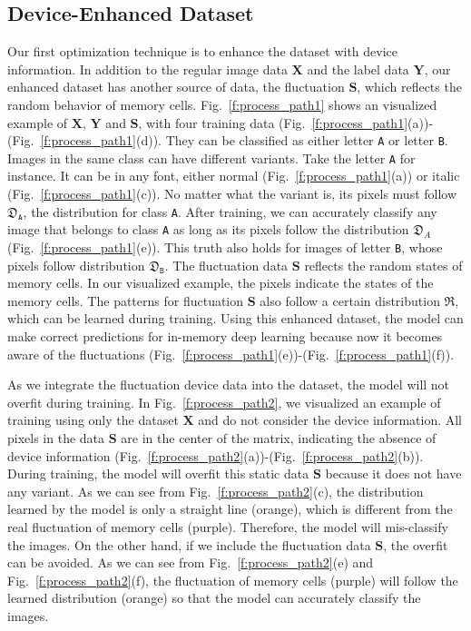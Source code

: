 \documentclass[10pt,journal,compsoc]{IEEEtran}
\begin{document}
\subsection{Device-Enhanced Dataset}

Our first optimization technique is to enhance the dataset with device information. In addition to the regular image data $\mathbf{X}$ and the label data $\mathbf{Y}$, our enhanced dataset has another source of data, the fluctuation $\mathbf{S}$, which reflects the random behavior of memory cells. Fig.~\ref{f:process_path1} shows an visualized example of $\mathbf{X}$, $\mathbf{Y}$ and $\mathbf{S}$, with four training data (Fig.~\ref{f:process_path1}(a))-(Fig.~\ref{f:process_path1}(d)). They can be classified as either letter \texttt{A} or letter \texttt{B}. Images in the same class can have different variants. Take the letter \texttt{A} for instance. It can be in any font, either normal (Fig.~\ref{f:process_path1}(a)) or italic (Fig.~\ref{f:process_path1}(c)). No matter what the variant is, its pixels must follow $\mathfrak{D}_\texttt{A}$, the distribution for class \texttt{A}. After training, we can accurately classify any image that belongs to class \texttt{A} as long as its pixels follow the distribution $\mathfrak{D}_A$ (Fig.~\ref{f:process_path1}(e)). This truth also holds for images of letter \texttt{B}, whose pixels follow distribution $\mathfrak{D}_\texttt{B}$. The fluctuation data $\mathbf{S}$ reflects the random states of memory cells. In our visualized example, the pixels indicate the states of the memory cells. The patterns for fluctuation $\mathbf{S}$ also follow a certain distribution $\mathfrak{R}$, which can be learned during training. Using this enhanced dataset, the model can make correct predictions for in-memory deep learning because now it becomes aware of the fluctuations (Fig.~\ref{f:process_path1}(e))-(Fig.~\ref{f:process_path1}(f)).

As we integrate the fluctuation device data into the dataset, the model will not overfit during training. In Fig.~\ref{f:process_path2}, we visualized an example of training using only the dataset $\mathbf{X}$ and do not consider the device information. All pixels in the data $\mathbf{S}$ are in the center of the matrix, indicating the absence of device information (Fig.~\ref{f:process_path2}(a))-(Fig.~\ref{f:process_path2}(b)). During training, the model will overfit this static data $\mathbf{S}$ because it does not have any variant. As we can see from Fig.~\ref{f:process_path2}(c), the distribution learned by the model is only a straight line (orange), which is different from the real fluctuation of memory cells (purple). Therefore, the model will mis-classify the images. On the other hand, if we include the fluctuation data $\mathbf{S}$, the overfit can be avoided. As we can see from Fig.~\ref{f:process_path2}(e) and Fig.~\ref{f:process_path2}(f), the fluctuation of memory cells (purple) will follow the learned distribution (orange) so that the model can accurately classify the images.
\end{document}
